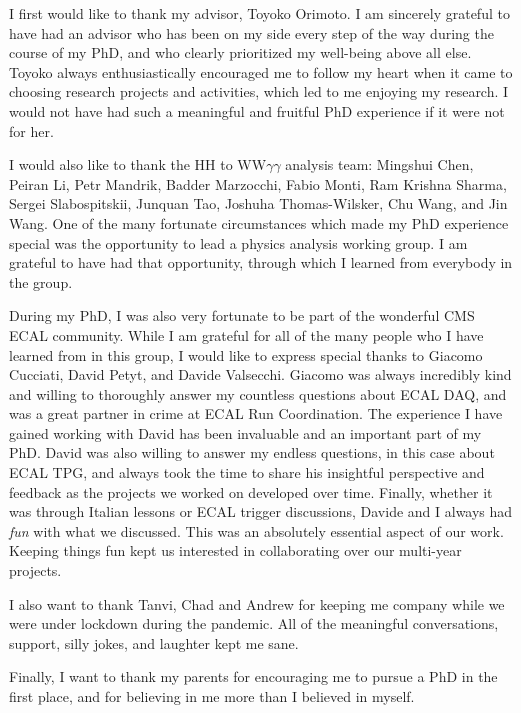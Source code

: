 I first would like to thank my advisor, Toyoko Orimoto. I am sincerely grateful to have had an advisor who has been on my side every step of the way during the course of my PhD, and who clearly prioritized my well-being above all else. Toyoko always enthusiastically encouraged me to follow my heart when it came to choosing research projects and activities, which led to me enjoying my research. I would not have had such a meaningful and fruitful PhD experience if it were not for her. 

I would also like to thank the HH to WW$\gamma\gamma$ analysis team: Mingshui Chen, Peiran Li, Petr Mandrik, Badder Marzocchi, Fabio Monti, Ram Krishna Sharma, Sergei Slabospitskii, Junquan Tao, Joshuha Thomas-Wilsker, Chu Wang, and Jin Wang. One of the many fortunate circumstances which made my PhD experience special was the opportunity to lead a physics analysis working group. I am grateful to have had that opportunity, through which I learned from everybody in the group. 

During my PhD, I was also very fortunate to be part of the wonderful CMS ECAL community. While I am grateful for all of the many people who I have learned from in this group, I would like to express special thanks to Giacomo Cucciati, David Petyt, and Davide Valsecchi. Giacomo was always incredibly kind and willing to thoroughly answer my countless questions about ECAL DAQ, and was a great partner in crime at ECAL Run Coordination. The experience I have gained working with David has been invaluable and an important part of my PhD. David was also willing to answer my endless questions, in this case about ECAL TPG, and always took the time to share his insightful perspective and feedback as the projects we worked on developed over time. Finally, whether it was through Italian lessons or ECAL trigger discussions, Davide and I always had \textit{fun} with what we discussed. This was an absolutely essential aspect of our work. Keeping things fun kept us interested in collaborating over our multi-year projects. 

I also want to thank Tanvi, Chad and Andrew for keeping me company while we were under lockdown during the pandemic. All of the meaningful conversations, support, silly jokes, and laughter kept me sane.  

Finally, I want to thank my parents for encouraging me to pursue a PhD in the first place, and for believing in me more than I believed in myself. 